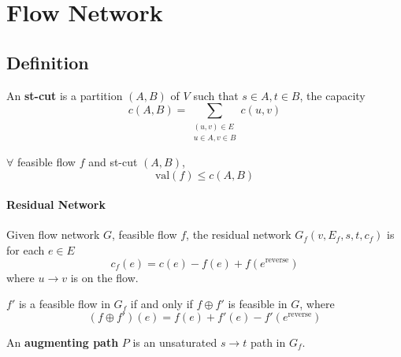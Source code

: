 
\section{Flow Network}
\subsection{Definition}
\newcommand{\val}{\mathrm{val}}
An \textbf{st-cut} is a partition  $ (A,B) $ of  $ V $ such that  $ s\in A,t\in B $, the capacity 
\[c(A,B)=\sum_{\substack{(u,v)\in E\\u\in A,v\in B}}c(u,v)\]   
\begin{claim}
    $ \forall  $ feasible flow  $ f $ and st-cut  $ (A,B) $, 
    \[\val(f) \leq c(A,B)\]  
\end{claim}
\paragraph{Residual Network} Given flow network  $ G $, feasible flow  $ f $, the residual network $ G_f(v,E_f,s,t,c_f) $ is for each  $ e\in E $ 
\[c_f(e)=c(e)-f(e)+f(e^{\mathrm{reverse}})\]
where  $ u\to v $ is on the flow.
\begin{claim}
    $ f' $ is a feasible flow in  $ G_f $ if and only if  $ f\oplus f' $ is feasible in  $ G $, where 
    \[(f\oplus f')(e)=f(e)+f'(e)-f'(e^{\mathrm{reverse}})\]    
\end{claim}     

An \textbf{augmenting path}  $ P $ is an unsaturated  $ s\to t $ path in  $ G_f $.

